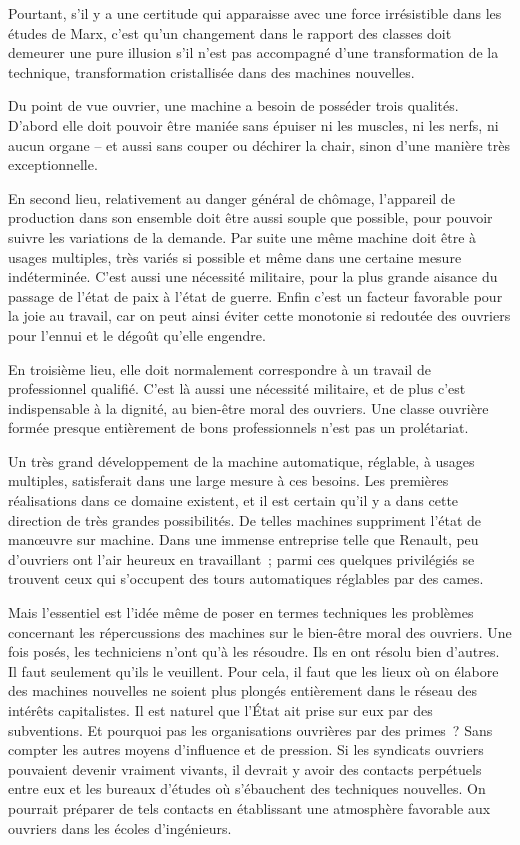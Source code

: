 \documentclass[french,twoside]{book} %
\begin{document}
Pourtant, s'il y a une certitude qui apparaisse avec une force irrésistible dans les études de Marx, c'est qu'un changement dans le rapport des classes doit demeurer une pure illusion s'il n'est pas accompagné d'une transformation de la technique, transformation cristallisée dans des machines nouvelles.\par
Du point de vue ouvrier, une machine a besoin de posséder trois qualités. D'abord elle doit pouvoir être maniée sans épuiser ni les muscles, ni les nerfs, ni aucun organe – et aussi sans couper ou déchirer la chair, sinon d'une manière très exceptionnelle.\par
En second lieu, relativement au danger général de chômage, l'appareil de production dans son ensemble doit être aussi souple que possible, pour pouvoir suivre les variations de la demande. Par suite une même machine doit être à usages multiples, très variés si possible et même dans une certaine mesure indéterminée. C'est aussi une nécessité militaire, pour la plus grande aisance du passage de l'état de paix à l'état de guerre. Enfin c'est un facteur favorable pour la joie au travail, car on peut ainsi éviter cette monotonie si redoutée des ouvriers pour l'ennui et le dégoût qu'elle engendre.\par
En troisième lieu, elle doit normalement correspondre à un travail de professionnel qualifié. C'est là aussi une nécessité militaire, et de plus c'est indispensable à la dignité, au bien-être moral des ouvriers. Une classe ouvrière formée presque entièrement de bons professionnels n'est pas un prolétariat.\par
Un très grand développement de la machine automatique, réglable, à usages multiples, satisferait dans une large mesure à ces besoins. Les premières réalisations dans ce domaine existent, et il est certain qu'il y a dans cette direction de très grandes possibilités. De telles machines suppriment l'état de manœuvre sur machine. Dans une immense entreprise telle que Renault, peu d'ouvriers ont l'air heureux en travaillant ; parmi ces quelques privilégiés se trouvent ceux qui s'occupent des tours automatiques réglables par des cames.\par
Mais l'essentiel est l'idée même de poser en termes techniques les problèmes concernant les répercussions des machines sur le bien-être moral des ouvriers. Une fois posés, les techniciens n'ont qu'à les résoudre. Ils en ont résolu bien d'autres. Il faut seulement qu'ils le veuillent. Pour cela, il faut que les lieux où on élabore des machines nouvelles ne soient plus plongés entièrement dans le réseau des intérêts capitalistes. Il est naturel que l'État ait prise sur eux par des subventions. Et pourquoi pas les organisations ouvrières par des primes ? Sans compter les autres moyens d'influence et de pression. Si les syndicats ouvriers pouvaient devenir vraiment vivants, il devrait y avoir des contacts perpétuels entre eux et les bureaux d'études où s'ébauchent des techniques nouvelles. On pourrait préparer de tels contacts en établissant une atmosphère favorable aux ouvriers dans les écoles d'ingénieurs.\par
\end{document}
